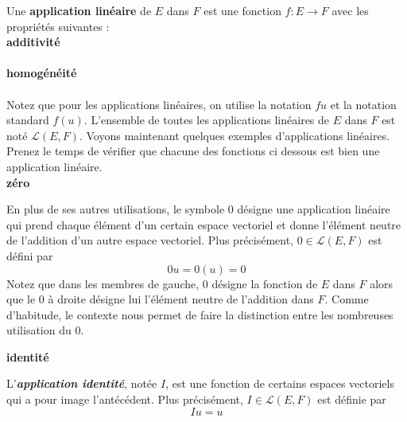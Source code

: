 \documentclass[12pt]{book}
\begin{document}
Une \textbf{application linéaire} de $E$ dans $F$ est une fonction $f:E \to F$ avec les propriétés suivantes :
\\


\smallskip\noindent 
\textbf{additivité} \\
  \\

\noindent 
\textbf{homogénéité} \\
  \\
Notez que pour les applications linéaires, on utilise la notation $fu$ et la notation standard $f(u)$.
L'ensemble de toutes les applications linéaires de $E$ dans $F$ est noté $\mathcal{L}(E,F)$. Voyons maintenant quelques exemples d'applications linéaires. Prenez le temps de vérifier que chacune des fonctions ci dessous est bien une application linéaire. \\

\noindent 
\textbf{zéro}
\begin{indpar}
En plus de ses autres utilisations, le symbole $0$ désigne une application linéaire qui prend chaque élément d'un certain espace vectoriel et donne l'élément neutre de l'addition d'un autre espace vectoriel. Plus précisément, $0 \in \mathcal{L}(E,F)$ est défini par 
\begin{equation*}
    0u = 0(u) =0
\end{equation*}
\noindent
Notez que dans les membres de gauche, $0$ désigne la fonction de $E$ dans $F$ alors que le $0$ à droite désigne lui l'élément neutre de l'addition dans $F$. Comme d'habitude, le contexte nous permet de faire la distinction entre les nombreuses utilisation du $0$.
\end{indpar}

\noindent 
\textbf{identité}
\begin{indpar}
L'\textbf{\emph{application identité}}, notée $I$, est une fonction de certains espaces vectoriels qui a pour image l'antécédent. Plus précisément, $I \in \mathcal{L}(E, F)$  est définie par 
\begin{equation*}
    Iu = u
\end{equation*}
\end{indpar}
\end{document}

